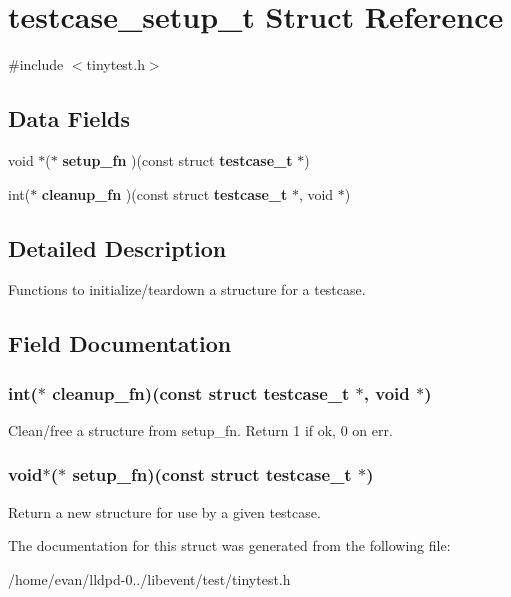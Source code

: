 \section{testcase\-\_\-setup\-\_\-t \-Struct \-Reference}
\label{structtestcase__setup__t}


{\ttfamily \#include $<$tinytest.\-h$>$}

\subsection*{\-Data \-Fields}
\begin{DoxyCompactItemize}
\item 
void $\ast$($\ast$ {\bf setup\-\_\-fn} )(const struct {\bf testcase\-\_\-t} $\ast$)
\item 
int($\ast$ {\bf cleanup\-\_\-fn} )(const struct {\bf testcase\-\_\-t} $\ast$, void $\ast$)
\end{DoxyCompactItemize}


\subsection{\-Detailed \-Description}
\-Functions to initialize/teardown a structure for a testcase. 

\subsection{\-Field \-Documentation}
\subsubsection[{cleanup\-\_\-fn}]{\setlength{\rightskip}{0pt plus 5cm}int($\ast$ {\bf cleanup\-\_\-fn})(const struct {\bf testcase\-\_\-t} $\ast$, void $\ast$)}\label{structtestcase__setup__t_a3814fa1bd63919aa821f1cdac47fd3c1}
\-Clean/free a structure from setup\-\_\-fn. \-Return 1 if ok, 0 on err. 
\subsubsection[{setup\-\_\-fn}]{\setlength{\rightskip}{0pt plus 5cm}void$\ast$($\ast$ {\bf setup\-\_\-fn})(const struct {\bf testcase\-\_\-t} $\ast$)}\label{structtestcase__setup__t_a115d5ed5f18a649e3ec99919b184ce1e}
\-Return a new structure for use by a given testcase. 

\-The documentation for this struct was generated from the following file\-:\begin{DoxyCompactItemize}
\item 
/home/evan/lldpd-\/0../libevent/test/tinytest.\-h\end{DoxyCompactItemize}
